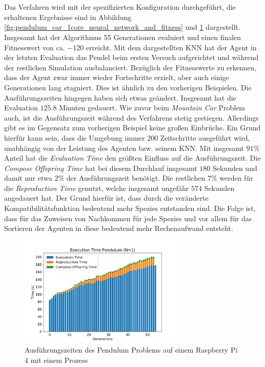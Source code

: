 \\\\
Das Verfahren wird mit der spezifizierten Konfiguration durchgeführt, die erhaltenen Ergebnisse sind in Abbildung \ref{fig:pendulum_car_1core_neural_network_and_fitness} und \ref{fig:pendulum_1core_1pi_time} dargestellt. Insgesamt hat der Algorithmus 55 Generationen evaluiert und einen finalen Fitnesswert von ca. $-120$ erreicht. Mit dem dargestellten \ac{KNN} hat der Agent in der letzten Evaluation das Pendel beim ersten Versuch aufgerichtet und während der restlichen Simulation ausbalanciert. Bezüglich der Fitnesswerte zu erkennen, dass der Agent zwar immer wieder Fortschritte erzielt, aber auch einige Generationen lang stagniert. Dies ist ähnlich zu den vorherigen Beispielen. Die Ausführungszeiten hingegen haben sich etwas geändert. Insgesamt hat die Evaluation $125.8$ Minuten gedauert. Wie zuvor beim \emph{Mountain Car} Problem auch, ist die Ausführungszeit während des Verfahrens stetig gestiegen. Allerdings gibt es im Gegensatz zum vorherigen Beispiel keine großen Einbrüche. Ein Grund hierfür kann sein, dass die Umgebung immer $200$ Zeitschritte ausgeführt wird, unabhängig von der Leistung des Agenten bzw. seinem \ac{KNN}. Mit insgesamt $91\%$ Anteil hat die \emph{Evaluation Time} den größten Einfluss auf die Ausführungszeit. Die \emph{Compose Offspring Time} hat bei diesem Durchlauf insgesamt $180$ Sekunden und damit nur etwa $2\%$ der Ausführungszeit benötigt. Die restlichen $7\%$ werden für die \emph{Reproduction Time} genutzt, welche insgesamt ungefähr $574$ Sekunden angedauert hat. Der Grund hierfür ist, dass durch die veränderte Kompatibilitätsfunktion bedeutend mehr Spezies entstanden sind. Die Folge ist, dass für das Zuweisen von Nachkommen für jede Spezies und vor allem für das Sortieren der Agenten in diese bedeutend mehr Rechenaufwand entsteht. 

\begin{figure}[!h]
	\centering
	\includegraphics[width=0.7\textwidth]{./img/pendulum_single_core/pendulum_1_1core_1pi_time.pdf} 
	\caption{Ausführungszeiten des Pendulum Problems auf einem Raspberry Pi 4 mit einem Prozess}
	\label{fig:pendulum_1core_1pi_time}
\end{figure}


